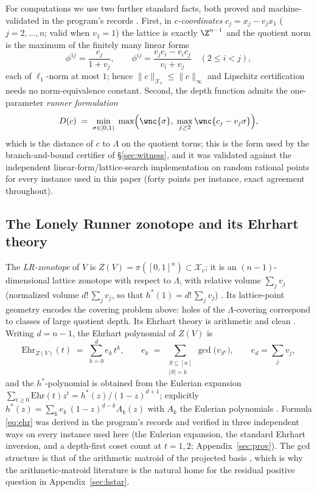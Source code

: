 For computations we use two further standard facts, both proved and
machine-validated in the program's records \cite{prog-artifacts}. First,
in \emph{$c$-coordinates} $c_j=x_j-v_jx_1$ ($j=2,\dots,n$; valid when
$v_1=1$) the lattice is exactly $\Z^{n-1}$ and the quotient norm is the
maximum of the finitely many linear forms
\[
\phi^{1j}=\frac{c_j}{1+v_j},\qquad
\phi^{ij}=\frac{v_jc_i-v_ic_j}{v_i+v_j}\quad(2\le i<j),
\]
each of $\ell_1$-norm at most $1$; hence
$\|c\|_{\mathcal{X}_v}\le\|c\|_\infty$ and Lipschitz certification
needs no norm-equivalence constant. Second, the depth function admits the
one-parameter \emph{runner formulation}
\begin{equation}\label{eq:runnerform}
D(c)\;=\;\min_{\sigma\in[0,1)}\;\max\Bigl(\wnc{\sigma},\;
\max_{j\ge 2}\wnc{c_j-v_j\sigma}\Bigr),
\end{equation}
which is the distance of $c$ to $\Lambda$ on the quotient torus; this is
the form used by the branch-and-bound certifier of \S\ref{sec:witness},
and it was validated against the independent linear-form/lattice-search
implementation on random rational points for every instance used in this
paper (forty points per instance, exact agreement throughout).

\subsection{The Lonely Runner zonotope and its Ehrhart theory}

The \emph{LR-zonotope} of $V$ is $Z(V)=\pi([0,1]^n)\subset
\mathcal{X}_v$; it is an $(n{-}1)$-dimensional lattice zonotope with
respect to $\Lambda$, with relative volume $\sum_j v_j$ (normalized
volume $d!\,\sum_j v_j$, so that $h^*(1)=d!\,\sum_j v_j$)
\cite{Shephard,BeckRobins}. Its lattice-point geometry encodes the
covering problem above: holes of the $\Lambda$-covering correspond to
classes of large quotient depth. Its Ehrhart theory is arithmetic and
clean \cite{BeckRobins,dAMoci,StanleyEC}. Writing $d=n-1$, the Ehrhart
polynomial of $Z(V)$ is
\begin{equation}\label{eq:ehr}
\mathrm{Ehr}_{Z(V)}(t)\;=\;\sum_{k=0}^{d} e_k\,t^k,\qquad
e_k\;=\;\sum_{\substack{S\subseteq[n]\\|S|=k}}\gcd\!\bigl(v_{S^c}\bigr),
\qquad e_d=\sum_j v_j,
\end{equation}
and the $h^*$-polynomial is obtained
from the Eulerian expansion
$\sum_{t\ge0}\mathrm{Ehr}(t)z^t=h^*(z)/(1-z)^{d+1}$; explicitly
$h^*(z)=\sum_k e_k\,(1-z)^{d-k}A_k(z)$ with $A_k$ the Eulerian
polynomials \cite{Frobenius}. Formula \eqref{eq:ehr} was derived in the
program's records and verified in three independent ways on every
instance used here (the Eulerian expansion, the standard Ehrhart
inversion, and a depth-first coset count at $t=1,2$;
Appendix~\ref{sec:prov}). The gcd structure is that of the arithmetic
matroid of the projected basis \cite{dAMoci}, which is why the
arithmetic-matroid literature is the natural home for the residual
positive question in Appendix~\ref{sec:hstar}.

